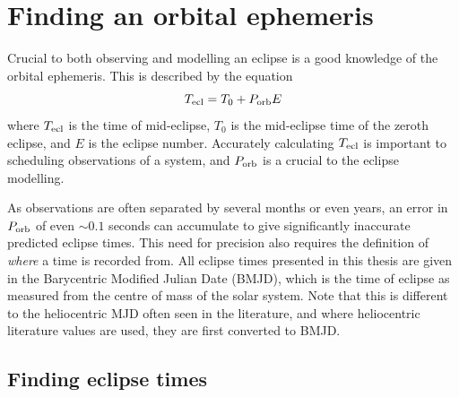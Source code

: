\section{Finding an orbital ephemeris}\label{sect:modelling:getting ephemeris}

Crucial to both observing and modelling an eclipse is a good knowledge of the orbital ephemeris. This is described by the equation
\begin{equation}
    \label{eqn:modelling:general ephemeris equation}
    T_{\rm ecl} = T_0 + P_{\rm orb} E
\end{equation}
where $T_{\rm ecl}$ is the time of mid-eclipse, $T_0$ is the mid-eclipse time of the zeroth eclipse, and $E$ is the eclipse number. Accurately calculating $T_{\rm ecl}$ is important to scheduling observations of a system, and $P_{\rm orb}$ is a crucial to the eclipse modelling.

As observations are often separated by several months or even years, an error in $P_{\rm orb}$ of even $\sim 0.1$ seconds can accumulate to give significantly inaccurate predicted eclipse times. This need for precision also requires the definition of {\it where} a time is recorded from. All eclipse times presented in this thesis are given in the Barycentric Modified Julian Date (BMJD), which is the time of eclipse as measured from the centre of mass of the solar system. Note that this is different to the heliocentric MJD often seen in the literature, and where heliocentric literature values are used, they are first converted to BMJD.

\subsection{Finding eclipse times}\label{sect:modelling:finding eclipse times}

